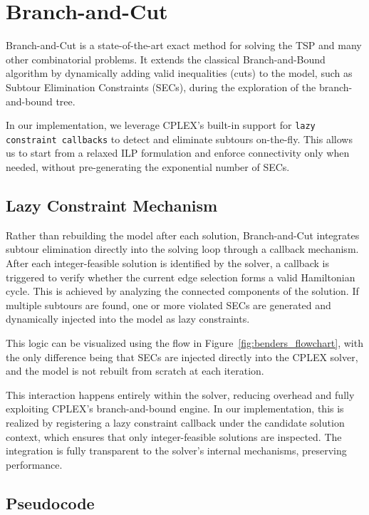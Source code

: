\section{Branch-and-Cut}

Branch-and-Cut is a state-of-the-art exact method for solving the TSP and many other combinatorial problems. It extends the classical Branch-and-Bound algorithm by dynamically adding valid inequalities (cuts) to the model, such as Subtour Elimination Constraints (SECs), during the exploration of the branch-and-bound tree.

In our implementation, we leverage CPLEX’s built-in support for \texttt{lazy constraint callbacks} to detect and eliminate subtours on-the-fly. This allows us to start from a relaxed ILP formulation and enforce connectivity only when needed, without pre-generating the exponential number of SECs.

\subsection{Lazy Constraint Mechanism}

Rather than rebuilding the model after each solution, Branch-and-Cut integrates subtour elimination directly into the solving loop through a callback mechanism. After each integer-feasible solution is identified by the solver, a callback is triggered to verify whether the current edge selection forms a valid Hamiltonian cycle. This is achieved by analyzing the connected components of the solution. If multiple subtours are found, one or more violated SECs are generated and dynamically injected into the model as lazy constraints.

This logic can be visualized using the flow in Figure~\ref{fig:benders_flowchart}, with the only difference being that SECs are injected directly into the CPLEX solver, and the model is not rebuilt from scratch at each iteration.

This interaction happens entirely within the solver, reducing overhead and fully exploiting CPLEX’s branch-and-bound engine. In our implementation, this is realized by registering a lazy constraint callback under the candidate solution context, which ensures that only integer-feasible solutions are inspected. The integration is fully transparent to the solver's internal mechanisms, preserving performance.

\subsection{Pseudocode}

